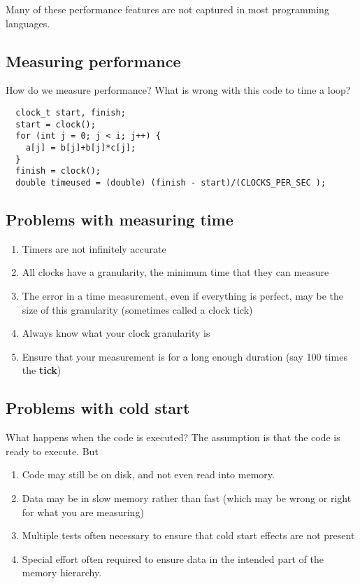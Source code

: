 \noindent
Many of these  performance features are not captured in most programming languages.

\subsection*{Measuring performance}

How do we measure performance? What is wrong with this code to time a loop?








\begin{verbatim}
  clock_t start, finish;
  start = clock();
  for (int j = 0; j < i; j++) {
    a[j] = b[j]+b[j]*c[j];
  }
  finish = clock();
  double timeused = (double) (finish - start)/(CLOCKS_PER_SEC );

\end{verbatim}


\subsection*{Problems with measuring time}
\begin{enumerate}
\item Timers are not infinitely accurate

\item All clocks have a granularity, the minimum time that they can measure

\item The error in a time measurement, even if everything is perfect, may be the size of this granularity (sometimes called a clock tick)

\item Always know what your clock granularity is

\item Ensure that your measurement is for a long enough duration (say 100 times the \textbf{tick})
\end{enumerate}

\noindent
\subsection*{Problems with cold start}

What happens when the code is executed? The assumption is that the code is ready to
execute. But
\begin{enumerate}
\item Code may still be on disk, and not even read into memory.

\item Data may be in slow memory rather than fast (which may be wrong or right for what you are measuring)

\item Multiple tests often necessary to ensure that cold start effects are not present

\item Special effort often required to ensure data in the intended part of the memory hierarchy.
\end{enumerate}

